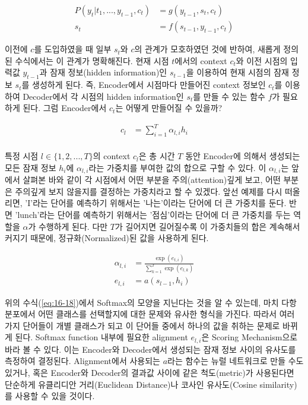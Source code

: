 \documentclass[draft=false]{oblivoir}
\begin{document}
\begin{equation}
	\begin{split}
		P(y_t|t_1, ..., y_{t-1}, c_t) & = g(y_{t-1}, s_t, c_t)\\
		s_t & = f(s_{t-1}, y_{t-1}, c_t)
	\end{split}
	\label{eq:16-16}
\end{equation}

이전에 $c$를 도입하였을 때 일부 $s_t$와 $c$의 관계가 모호하였던 것에 반하여, 새롭게 정의된 수식에서는 이 관계가 명확해진다. 현재 시점 $t$에서의 context $c_t$와 이전 시점의 입력값 $y_{t-1}$과 잠재 정보(hidden information)인 $s_{t-1}$을 이용하여 현재 시점의 잠재 정보 $s_t$를 생성하게 된다. 즉, Encoder에서 시점마다 만들어진 context 정보인 $c_t$를 이용하여 Decoder에서 각 시점의 hidden information인 $s_t$를 만들 수 있는 함수 $f$가 필요하게 된다. 그럼 Encoder에서 $c_t$는 어떻게 만들어질 수 있을까?\par

\begin{equation}
	\begin{split}
		c_l & = \sum_{i=1}^{T}\alpha_{l,i} h_i\\
	\end{split}
	\label{eq:16-17}
\end{equation}

특정 시점 $l \in \{1, 2, ..., T\}$의 context $c_l$은 총 시간 $T$ 동안 Encoder에 의해서 생성되는 모든 잠재 정보 $h_i$에 $\alpha_{l,i}$라는 가중치를 부여한 값의 합으로 구할 수 있다. 이 $\alpha_{l,i}$는 앞에서 살펴본 바와 같이 각 시점에서 어떤 부분을 주의(attention)깊게 보고, 어떤 부분은 주의깊게 보지 않을지를 결정하는 가중치라고 할 수 있겠다. 앞선 예제를 다시 떠올리면, 'I'라는 단어를 예측하기 위해서는 '나는'이라는 단어에 더 큰 가중치를 둔다. 반면 'lunch'라는 단어를 예측하기 위해서는 '점심'이라는 단어에 더 큰 가중치를 두는 역할을 $\alpha$가 수행하게 된다. 다만 $T$가 길어지면 길어질수록 이 가중치들의 합은 계속해서 커지기 때문에, 정규화(Normalized)된 값을 사용하게 된다. \par

\begin{equation}
	\begin{split}
		\alpha_{l,i} & = \frac{\exp{(e_{t,i})}}{\sum_{k=1}^{T}\exp{(e_{l,k})}}\\
        e_{l,i} & = a(s_{l-1}, h_i)
	\end{split}
	\label{eq:16-18}
\end{equation}

위의 수식(\ref{eq:16-18})에서 Softmax의 모양을 지닌다는 것을 알 수 있는데, 마치 다항분포에서 어떤 클래스를 선택할지에 대한 문제와 유사한 형식을 가진다. 따라서 여러 가지 단어들이 개별 클래스가 되고 이 단어들 중에서 하나의 값을 취하는 문제로 바뀌게 된다. Softmax function 내부에 필요한 alignment $e_{l,i}$은 Scoring Mechanism으로 바라 볼 수 있다. 이는 Encoder와 Decoder에서 생성되는 잠재 정보 사이의 유사도를 측정하여 결정된다. Alignment에서 사용되는 $a$라는 함수는 뉴럴 네트워크로 만들 수도 있거나, 혹은 Encoder와 Decoder의 결과값 사이에 같은 척도(metric)가 사용된다면 단순하게 유클리디안 거리(Euclidean Distance)나 코사인 유사도(Cosine similarity)를 사용할 수 있을 것이다.
    
\end{document}
